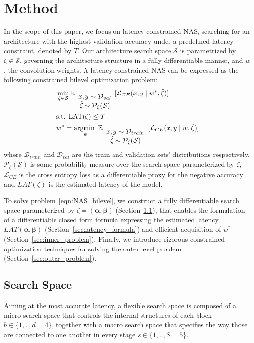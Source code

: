 \documentclass[dvipsnames,table,xcdraw]{article}
\newcommand{\argmin}{\operatornamewithlimits{argmin~}}
\newcommand{\balpha}{\bm{\alpha}}
\newcommand{\bbeta}{\bm{\beta}}
\begin{document}
\section{Method} \label{sec:method}
In the scope of this paper, we focus on latency-constrained NAS, searching for an architecture with the highest validation accuracy under a predefined latency constraint, denoted by $T$. Our architecture search space $\mathcal{S}$ is parametrized by $\zeta\in\mathcal{S}$, governing the architecture structure in a fully differentiable manner, and $w$, the convolution weights.
A latency-constrained NAS can be expressed as the following constrained bilevel optimization problem:
\begin{align}
&\min_{\zeta \in \mathcal{S}}  \mathbb{E}_{
\begin{array}{c}
 x, y \sim\mathcal{D}_{val} \\
\hat{\zeta} \sim \mathcal{P}_\zeta(\mathcal{S})
\end{array}
}[\mathcal{L}_{CE}(x, y \mid w^*, \hat{\zeta})] \notag\\
\label{eqn:NAS_bilevel}
&\text{s.t. } 
\text{LAT}(\zeta)\leq T \\
&w^*=\argmin_{w} \mathbb{E}_{
\begin{array}{c}
 x, y \sim\mathcal{D}_{train} \\
\hat{\zeta} \sim \mathcal{P}_\zeta(\mathcal{S})
\end{array}
}[\mathcal{L}_{CE}(x, y \mid w, \hat{\zeta}) ]\notag
\end{align}
where $\mathcal{D}_{train}$ and $\mathcal{D}_{val}$ are the train and validation sets' distributions respectively, $\mathcal{P}_\zeta(\mathcal{S})$ is some probability measure over the search space parameterized by $\zeta$, $\mathcal{L}_{CE}$ is the cross entropy loss as a differentiable proxy for the negative accuracy and $LAT(\zeta)$ is the estimated latency of the model.

To solve problem~\eqref{eqn:NAS_bilevel}, we construct a fully differentiable search space parameterized by $\zeta=(\balpha, \bbeta)$ (Section~\ref{sec:search_space}), that enables the formulation of a differentiable closed form formula expressing the estimated latency $LAT(\balpha, \bbeta)$ (Section~\ref{sec:latency_formula}) and efficient acquisition of $w^*$ (Section~\ref{sec:inner_problem}). Finally, we introduce rigorous constrained optimization techniques for solving the outer level problem (Section~\ref{sec:outer_problem}).

\subsection{Search Space}
\label{sec:search_space}
Aiming at the most accurate latency, a flexible search space is composed of a micro search space that controls the internal structures of each block $b\in\{1,..,d=4\}$, together with a macro search space that specifies the way those are connected to one another in every stage $s\in\{1,..,S=5\}$.
\end{document}
